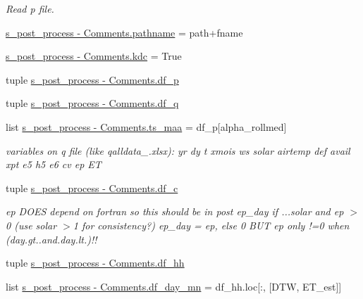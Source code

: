 \begin{DoxyCompactItemize}
\begin{DoxyCompactList}\small\item\em Read p file. \end{DoxyCompactList}\item 
\hyperlink{namespaces__post__process_01-_01_comments_a44e382ad617792a5ed02be95da593433}{s\+\_\+post\+\_\+process -\/ Comments.\+pathname} = path+fname
\item 
\hyperlink{namespaces__post__process_01-_01_comments_a9ad05e10331e51befb7fbd20adefb30e}{s\+\_\+post\+\_\+process -\/ Comments.\+kdc} = True
\item 
tuple \hyperlink{namespaces__post__process_01-_01_comments_a043c82fbb0106ffd9805f3c107892cf5}{s\+\_\+post\+\_\+process -\/ Comments.\+df\+\_\+p}
\item 
tuple \hyperlink{namespaces__post__process_01-_01_comments_ac48c9e765f3ad2bfb2f1dd1af5b16598}{s\+\_\+post\+\_\+process -\/ Comments.\+df\+\_\+q}
\item 
list \hyperlink{namespaces__post__process_01-_01_comments_a5cad3f0b3385326f66c3ea7402ac4b4b}{s\+\_\+post\+\_\+process -\/ Comments.\+ts\+\_\+maa} = df\+\_\+p\mbox{[}\textquotesingle{}alpha\+\_\+rollmed\textquotesingle{}\mbox{]}
\begin{DoxyCompactList}\small\item\em variables on q file (like qalldata\+\_.\+xlsx)\+: yr dy t xmois ws solar airtemp def avail xpt e5 h5 e6 cv ep E\+T \end{DoxyCompactList}\item 
tuple \hyperlink{namespaces__post__process_01-_01_comments_a816aaeb2a13f356b17e012a7e77253a7}{s\+\_\+post\+\_\+process -\/ Comments.\+df\+\_\+c}
\begin{DoxyCompactList}\small\item\em ep D\+O\+E\+S depend on fortran so this should be in post ep\+\_\+day if ...solar and ep $>$ 0 (use solar $>$1 for consistency?) ep\+\_\+day = ep, else 0 B\+U\+T ep only !=0 when (day.\+gt..\+and.\+day.\+lt.)!! \end{DoxyCompactList}\item 
tuple \hyperlink{namespaces__post__process_01-_01_comments_a799dd3cc5b8e24283cbce5d20d97168b}{s\+\_\+post\+\_\+process -\/ Comments.\+df\+\_\+hh}
\item 
list \hyperlink{namespaces__post__process_01-_01_comments_a1b2d87778a264a8cbd089338b879c0ad}{s\+\_\+post\+\_\+process -\/ Comments.\+df\+\_\+day\+\_\+mn} = df\+\_\+hh.\+loc\mbox{[}\+:, \mbox{[}\textquotesingle{}D\+T\+W\textquotesingle{}, \textquotesingle{}E\+T\+\_\+est\textquotesingle{}\mbox{]}\mbox{]}

\end{DoxyCompactItemize}
